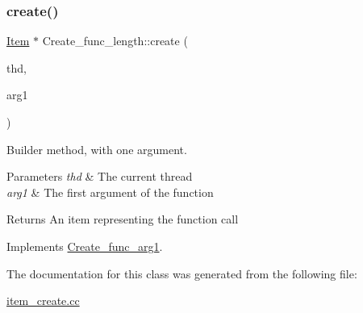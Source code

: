 \subsubsection{\texorpdfstring{create()}{create()}}
{\footnotesize\ttfamily \mbox{\hyperlink{classItem}{Item}} $\ast$ Create\+\_\+func\+\_\+length\+::create (\begin{DoxyParamCaption}\item[{T\+HD $\ast$}]{thd,  }\item[{\mbox{\hyperlink{classItem}{Item}} $\ast$}]{arg1 }\end{DoxyParamCaption})\hspace{0.3cm}{\ttfamily [virtual]}}

Builder method, with one argument. 
\begin{DoxyParams}{Parameters}
{\em thd} & The current thread \\
\hline
{\em arg1} & The first argument of the function \\
\hline
\end{DoxyParams}
\begin{DoxyReturn}{Returns}
An item representing the function call 
\end{DoxyReturn}


Implements \mbox{\hyperlink{classCreate__func__arg1_a3e9a98f755cd82c3e762e334c955a8c9}{Create\+\_\+func\+\_\+arg1}}.



The documentation for this class was generated from the following file\+:\begin{DoxyCompactItemize}
\item 
\mbox{\hyperlink{item__create_8cc}{item\+\_\+create.\+cc}}\end{DoxyCompactItemize}
